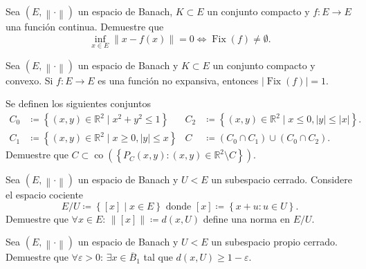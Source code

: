       \question

      Sea $\left(E,\left\|\cdot\right\|\right)$ un espacio de Banach,
      $K\subset E$ un conjunto compacto y $f\colon E\to E$ una
      función continua.
      Demuestre que
      \begin{equation*}
        \inf_{x\in E}\left\|x-f\left(x\right)\right\|=
        0\iff
        \operatorname{Fix}\left(f\right)\neq\emptyset.
      \end{equation*}

      \question

      Sea $\left(E,\left\|\cdot\right\|\right)$ un espacio de Banach
      y $K\subset E$ un conjunto compacto y convexo.
      Si $f\colon E\to E$ es una función no expansiva, entonces
      $\left|\operatorname{Fix}\left(f\right)\right|=1$.

      \question

      Se definen los siguientes conjuntos
      \begin{align*}
        C_{0}&\coloneqq
        \left\{\left(x,y\right)\in\mathbb{R}^{2}\mid
        x^{2}+y^{2}\leq 1\right\}&
        C_{2}&\coloneqq
        \left\{
          \left(x,y\right)\in\mathbb{R}^{2}\mid
          x\leq 0,
          \left|y\right|\leq\left|x\right|
        \right\}.\\
        C_{1}&\coloneqq
        \left\{
          \left(x,y\right)\in\mathbb{R}^{2}\mid
          x\geq 0,
          \left|y\right|\leq x
        \right\}&
        C&\coloneqq
        \left(C_{0}\cap C_{1}\right)\cup
        \left(C_{0}\cap C_{2}\right).
      \end{align*}
      Demuestre que
      \begin{math}
        C\subset
        \operatorname{co}
        \left(
          \left\{
            P_{C}\left(x,y\right):
            \left(x,y\right)\in
            \mathbb{R}^{2}\setminus C
          \right\}
        \right)
      \end{math}.

      \question

      Sea $\left(E,\left\|\cdot\right\|\right)$ un espacio de Banach
      y $U<E$ un subespacio cerrado.
      Considere el espacio cociente
      \begin{equation*}
        E/U\coloneqq
        \left\{\left[x\right]\mid x\in E\right\}
        \text { donde }
        \left[x\right]\coloneqq
        \left\{x+u:u\in U\right\}.
      \end{equation*}
      Demuestre que $\forall x\in E$:
      $\left\|\left[x\right]\right\|\coloneqq d\left(x,U\right)$
      define una norma en $E/U$.

      \question

      Sea $\left(E,\left\|\cdot\right\|\right)$ un espacio de Banach
      y $U<E$ un subespacio propio cerrado.
      Demuestre que $\forall\varepsilon>0$:
      $\exists x\in\overline{B}_{1}$ tal que
      $d\left(x,U\right)\geq 1-\varepsilon$.
